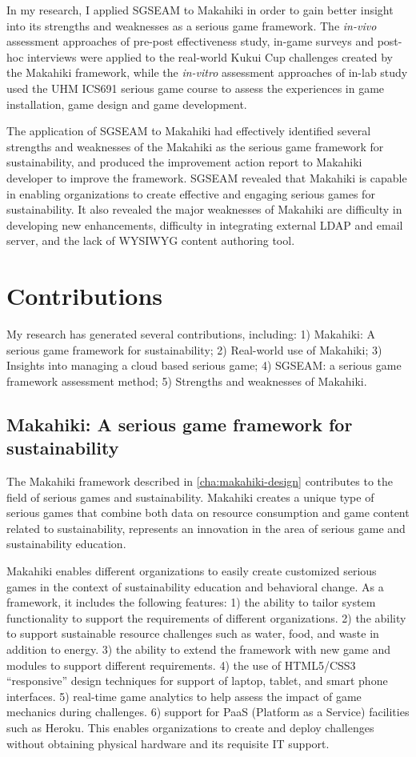 In my research, I applied SGSEAM to Makahiki in order to gain better insight into its strengths and weaknesses as a serious game framework. The {\em in-vivo} assessment approaches of pre-post effectiveness study, in-game surveys and post-hoc interviews were applied to the real-world Kukui Cup challenges created by the Makahiki framework, while the {\em in-vitro} assessment approaches of in-lab study used the UHM ICS691 serious game course to assess the experiences in game installation, game design and game development. 

The application of SGSEAM to Makahiki had effectively identified several strengths and weaknesses of the Makahiki as the serious game framework for sustainability, and produced the improvement action report to Makahiki developer to improve the framework. SGSEAM revealed that Makahiki is capable in enabling organizations to create effective and engaging serious games for sustainability. It also revealed the major weaknesses of Makahiki are difficulty in developing new enhancements,  difficulty in integrating external LDAP and email server, and the lack of WYSIWYG content authoring tool.

\section{Contributions}

My research has generated several contributions, including: 1) Makahiki: A serious game framework for sustainability; 2) Real-world use of Makahiki;  3) Insights into managing a cloud based serious game; 4) SGSEAM: a serious game framework assessment method; 5) Strengths and weaknesses of Makahiki.

\subsection{Makahiki: A serious game framework for sustainability}

The Makahiki framework described in \autoref{cha:makahiki-design} contributes to the field of serious games
and sustainability. Makahiki creates a unique type of serious games that combine
both data on resource consumption and game content related to sustainability, represents an innovation in the area of serious game and sustainability education. 

Makahiki enables different organizations to easily create customized serious games in the context of sustainability education and behavioral change. As a framework, it includes the following features: 1) the ability to tailor system functionality to support the requirements of different organizations. 2) the ability to support sustainable resource challenges such as water, food, and waste in addition to energy. 3) the ability to extend the framework with new game and modules to support different requirements. 4) the use of HTML5/CSS3 ``responsive'' design techniques for support of laptop, tablet, and smart phone interfaces. 5) real-time game analytics to help assess the impact of game mechanics during challenges. 6) support for PaaS (Platform as a Service) facilities such as Heroku. This enables organizations to create and deploy challenges without obtaining physical hardware and its requisite IT support.

